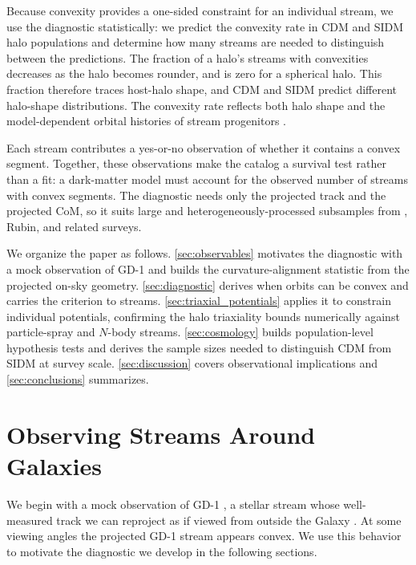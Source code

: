 \documentclass[linenumbers,twocolumn]{aastex701}
\begin{document}
    Because convexity provides a one-sided constraint for an individual stream, we use the diagnostic statistically: we predict the convexity rate in \gls{CDM} and \gls{SIDM} halo populations and determine how many streams are needed to distinguish between the predictions. %
    The fraction of a halo's streams with convexities decreases as the halo becomes rounder, and is zero for a spherical halo. %
    This fraction therefore traces host-halo shape, and \gls{CDM} and \gls{SIDM} predict different halo-shape distributions. %
    The convexity rate reflects both halo shape and the model-dependent orbital histories of stream progenitors \citep{Nadler+:2020:SignaturesVelocitydependentDark}. %

    Each stream contributes a yes-or-no observation of whether it contains a convex segment. %
    Together, these observations make the catalog a survival test rather than a fit: a dark-matter model must account for the observed number of streams with convex segments. %
    The diagnostic needs only the projected track and the projected \gls{CoM}, so it suits large and heterogeneously-processed subsamples from \euclid, \gls{Rubin}, and related surveys. %

    We organize the paper as follows. %
    \autoref{sec:observables} motivates the diagnostic with a mock observation of GD-1 and builds the curvature-alignment statistic from the projected on-sky geometry. %
    \autoref{sec:diagnostic} derives when orbits can be convex and carries the criterion to streams. %
    \autoref{sec:triaxial_potentials} applies it to constrain individual potentials, confirming the halo triaxiality bounds numerically against particle-spray and $N$-body streams. %
    \autoref{sec:cosmology} builds population-level hypothesis tests and derives the sample sizes needed to distinguish \gls{CDM} from \gls{SIDM} at survey scale. %
    \autoref{sec:discussion} covers observational implications and \autoref{sec:conclusions} summarizes. %


\section{Observing Streams Around Galaxies}\label{sec:observables}

    We begin with a mock observation of GD-1 \citep{Grillmair+Dionatos:2006:DetectionColdStellar}, a stellar stream whose well-measured track we can reproject as if viewed from outside the Galaxy \citep{Malhan+:2018,Starkman+:2025}. %
    At some viewing angles the projected GD-1 stream appears convex. %
    We use this behavior to motivate the diagnostic we develop in the following sections. %
\end{document}
